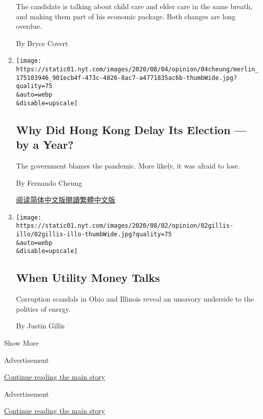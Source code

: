 \begin{enumerate}
  The candidate is talking about child care and elder care in the same
  breath, and making them part of his economic package. Both changes are
  long overdue.

  By Bryce Covert
\item
  \href{/2020/08/02/opinion/hong-kong-election-china.html}{}

  \texttt{[image: https://static01.nyt.com/images/2020/08/04/opinion/04cheung/merlin\_175103946\_901ecb4f-473c-4826-8ac7-a4771835ac6b-thumbWide.jpg?quality=75\\\&auto=webp\\\&disable=upscale]}

  \hypertarget{why-did-hong-kong-delay-its-election--by-a-year}{%
  \subsection{Why Did Hong Kong Delay Its Election --- by a
  Year?}\label{why-did-hong-kong-delay-its-election--by-a-year}}

  The government blames the pandemic. More likely, it was afraid to
  lose.

  By Fernando Cheung

  \href{https://cn.nytimes.com/opinion/20200803/hong-kong-election-china/}{阅读简体中文版}\href{https://cn.nytimes.com/opinion/20200803/hong-kong-election-china/zh-hant/}{閱讀繁體中文版}
\item
  \href{/2020/08/02/opinion/utility-corruption-energy.html}{}

  \texttt{[image: https://static01.nyt.com/images/2020/08/02/opinion/02gillis-illo/02gillis-illo-thumbWide.jpg?quality=75\\\&auto=webp\\\&disable=upscale]}

  \hypertarget{when-utility-money-talks}{%
  \subsection{When Utility Money Talks}\label{when-utility-money-talks}}

  Corruption scandals in Ohio and Illinois reveal an unsavory underside
  to the politics of energy.

  By Justin Gillis
\end{enumerate}

Show More

Advertisement

\protect\hyperlink{after-mid2}{Continue reading the main story}

Advertisement

\protect\hyperlink{after-mktg}{Continue reading the main story}


